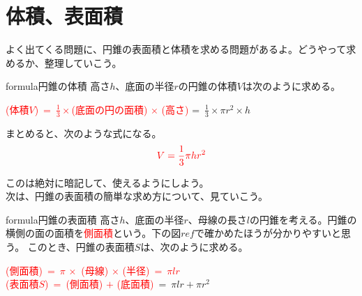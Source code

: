 \documentclass[11pt]{jsarticle}
\begin{document}
\section{体積、表面積}
よく出てくる問題に、円錐の表面積と体積を求める問題があるよ。どうやって求めるか、整理していこう。
\begin{statesp}[conevol]{formula}{円錐の体積}
高さ$h$、底面の半径$r$の円錐の体積$V$は次のように求める。
\begin{center}
\textcolor{red}{(体積$V$)\ =\ $\frac{1}{3} \times$(底面の円の面積) $\times$ (高さ)} =\ $\frac{1}{3} \times \pi r^2 \times h$ 
\end{center}
まとめると、次のような式になる。
\begin{equation}
\textcolor{red}{V=\frac{1}{3} \pi h r^2}
\end{equation}
\end{statesp}

このは絶対に暗記して、使えるようにしよう。\\
次は、円錐の表面積の簡単な求め方について、見ていこう。

\newpage

\begin{statesp}[conearea]{formula}{円錐の表面積}
高さ$h$、底面の半径$r$、母線の長さ$l$の円錐を考える。円錐の横側の面の面積を\textcolor{red}{側面積}という。下の図$ref$で確かめたほうが分かりやすいと思う。
このとき、円錐の表面積$S$は、次のように求める。
\begin{center}
\textcolor{red}{(側面積)\ =\ $\pi$ $\times$\ (母線) $\times$ (半径)\ =\ $\pi lr$}\\
\textcolor{red}{(表面積$S$)\ =\ (側面積) $+$ (底面積)}\ =\ $\pi lr + \pi r^2$
\end{center}
\end{statesp}
\end{document}

